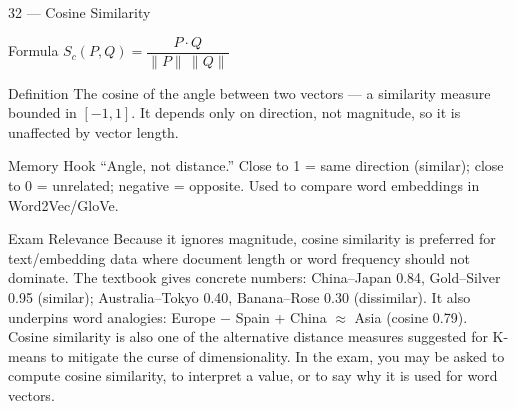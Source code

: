 \documentclass[aspectratio=169,8pt]{beamer}
\begin{document}
	\begin{frame}{32 --- Cosine Similarity}
		\begin{block}{Formula}
			$S_c(P,Q) = \dfrac{P \cdot Q}{\|P\|\,\|Q\|}$
		\end{block}
		\begin{block}{Definition}
			The cosine of the angle between two vectors --- a similarity measure bounded in $[-1, 1]$. It depends only on direction, not magnitude, so it is unaffected by vector length.
		\end{block}
		\begin{block}{Memory Hook}
			``Angle, not distance.'' Close to 1 = same direction (similar); close to 0 = unrelated; negative = opposite. Used to compare word embeddings in Word2Vec/GloVe.
		\end{block}
		\begin{block}{Exam Relevance}
			Because it ignores magnitude, cosine similarity is preferred for text/embedding data where document length or word frequency should not dominate. The textbook gives concrete numbers: China--Japan 0.84, Gold--Silver 0.95 (similar); Australia--Tokyo 0.40, Banana--Rose 0.30 (dissimilar). It also underpins word analogies: Europe $-$ Spain + China $\approx$ Asia (cosine 0.79). Cosine similarity is also one of the alternative distance measures suggested for K-means to mitigate the curse of dimensionality. In the exam, you may be asked to compute cosine similarity, to interpret a value, or to say why it is used for word vectors.
		\end{block}
	\end{frame}
	
\end{document}
